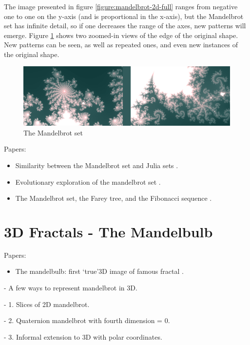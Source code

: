 The image presented in figure \ref{figure:mandelbrot-2d-full} ranges from negative one to one on the y-axis (and is proportional in the x-axis), but the Mandelbrot set has infinite detail, so if one decreases the range of the axes, new patterns will emerge. Figure \ref{figure:mandelbrot-2d-zoom} shows two zoomed-in views of the edge of the original shape. New patterns can be seen, as well as repeated ones, and even new instances of the original shape.

\begin{figure} \label{figure:mandelbrot-2d-zoom}
	\centering
	\includegraphics[width=\linewidth]{Images/Mandelbrot-2D-Zoom.png}
	\caption{The Mandelbrot set}
\end{figure}

Papers:
\begin{itemize}
	\item Similarity between the Mandelbrot set and Julia sets \cite{lei1990similarity}.
	\item Evolutionary exploration of the mandelbrot set \cite{ashlock2006evolutionary}.
	\item The Mandelbrot set, the Farey tree, and the Fibonacci sequence \cite{devaney1999mandelbrot}.
\end{itemize}

\section{3D Fractals - The Mandelbulb}

Papers:
\begin{itemize}
	\item The mandelbulb: first ‘true’3D image of famous fractal \cite{aron2009mandelbulb}.
\end{itemize}

\cite{aron2009mandelbulb}

- A few ways to represent mandelbrot in 3D.

- 1. Slices of 2D mandelbrot.

- 2. Quaternion mandelbrot with fourth dimension = 0.

- 3. Informal extension to 3D with polar coordinates.

